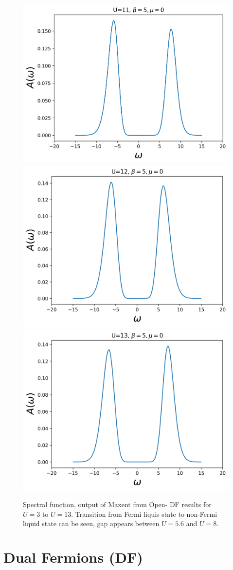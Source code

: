 \begin{figure}[ht]
    \includegraphics[width=0.45\linewidth]{fig2/dfspectral11.png}
    \includegraphics[width=0.45\linewidth]{fig2/dfspectral12.png}
    \includegraphics[width=0.45\linewidth]{fig2/dfspectral13.png}
    
\caption{ Spectral function, output of Maxent from Open- DF results for $U=3$ to $U=13$. Transition from Fermi liquis state to non-Fermi liquid state can be seen, gap appears between $U=5.6$ and $U=8$. \label{fig:DF_spectral}}
\vspace{-20pt}
\end{figure} 




\section{Dual Fermions (DF)}

